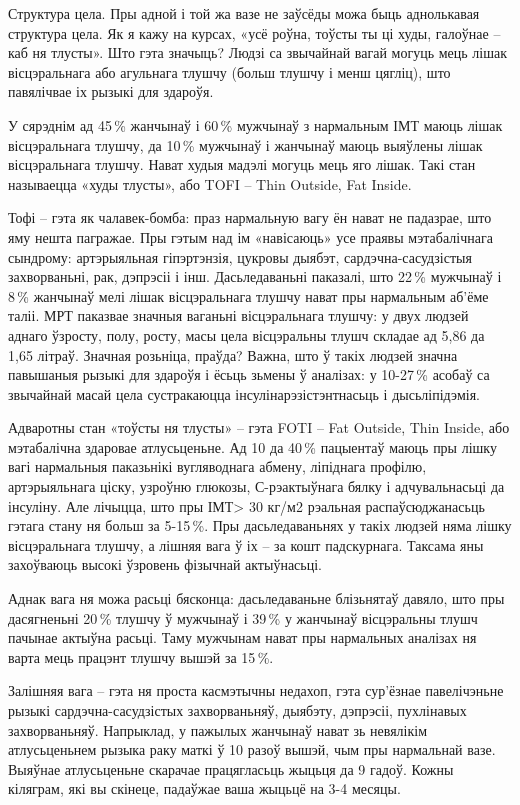 Структура цела. Пры адной і той жа вазе не заўсёды можа быць аднолькавая структура цела. Як я кажу на курсах, «усё роўна, тоўсты ты ці худы, галоўнае – каб ня тлусты». Што гэта значыць? Людзі са звычайнай вагай могуць мець лішак вісцэральнага або агульнага тлушчу (больш тлушчу і менш цягліц), што павялічвае іх рызыкі для здароўя.

У сярэднім ад 45\,\% жанчынаў і 60\,\% мужчынаў з нармальным ІМТ маюць лішак вісцэральнага тлушчу, да 10\,\% мужчынаў і жанчынаў маюць выяўлены лішак вісцэральнага тлушчу. Нават худыя мадэлі могуць мець яго лішак. Такі стан называецца «худы тлусты», або TOFI – Thin Outside, Fat Inside.

Тофі – гэта як чалавек-бомба: праз нармальную вагу ён нават не падазрае, што яму нешта пагражае. Пры гэтым над ім «навісаюць» усе праявы мэтабалічнага сындрому: артэрыяльная гіпэртэнзія, цукровы дыябэт, сардэчна-сасудзістыя захворваньні, рак, дэпрэсіі і інш. Дасьледаваньні паказалі, што 22\,\% мужчынаў і 8\,\% жанчынаў мелі лішак вісцэральнага тлушчу нават пры нармальным аб'ёме таліі. МРТ паказвае значныя ваганьні вісцэральнага тлушчу: у двух людзей аднаго ўзросту, полу, росту, масы цела вісцэральны тлушч складае ад 5,86 да 1,65 літраў. Значная розьніца, праўда? Важна, што ў такіх людзей значна павышаныя рызыкі для здароўя і ёсьць зьмены ў аналізах: у 10-27\,\% асобаў са звычайнай масай цела сустракаюцца інсулінарэзістэнтнасьць і дысьліпідэмія.

Адваротны стан «тоўсты ня тлусты» – гэта FOTI – Fat Outside, Thin Inside, або мэтабалічна здаровае атлусьценьне. Ад 10 да 40\,\% пацыентаў маюць пры лішку вагі нармальныя паказьнікі вугляводнага абмену, ліпіднага профілю, артэрыяльнага ціску, узроўню глюкозы, С-рэактыўнага бялку і адчувальнасьці да інсуліну. Але лічыцца, што пры ІМТ> 30 кг/м2 рэальная распаўсюджанасьць гэтага стану ня больш за 5-15\,\%. Пры дасьледаваньнях у такіх людзей няма лішку вісцэральнага тлушчу, а лішняя вага ў іх – за кошт падскурнага. Таксама яны захоўваюць высокі ўзровень фізычнай актыўнасьці.

Аднак вага ня можа расьці бясконца: дасьледаваньне блізьнятаў давяло, што пры дасягненьні 20\,\% тлушчу ў мужчынаў і 39\,\% у жанчынаў вісцэральны тлушч пачынае актыўна расьці. Таму мужчынам нават пры нармальных аналізах ня варта мець працэнт тлушчу вышэй за 15\,\%.

Залішняя вага – гэта ня проста касмэтычны недахоп, гэта сур'ёзнае павелічэньне рызыкі сардэчна-сасудзістых захворваньняў, дыябэту, дэпрэсіі, пухлінавых захворваньняў. Напрыклад, у пажылых жанчынаў нават зь невялікім атлусьценьнем рызыка раку маткі ў 10 разоў вышэй, чым пры нармальнай вазе. Выяўнае атлусьценьне скарачае працягласьць жыцьця да 9 гадоў. Кожны кіляграм, які вы скінеце, падаўжае ваша жыцьцё на 3-4 месяцы.

